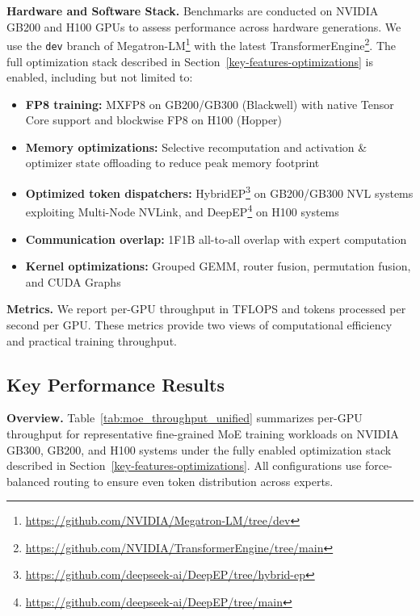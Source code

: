 \textbf{Hardware and Software Stack.}
Benchmarks are conducted on NVIDIA GB200 and H100 GPUs to assess performance across hardware generations. We use the \texttt{dev} branch of Megatron-LM\footnote{\url{https://github.com/NVIDIA/Megatron-LM/tree/dev}} with the latest TransformerEngine\footnote{\url{https://github.com/NVIDIA/TransformerEngine/tree/main}}. The full optimization stack described in Section~\ref{key-features-optimizations} is enabled, including but not limited to:
\begin{itemize}[noitemsep,topsep=0pt]
    \item \textbf{FP8 training:} MXFP8 on GB200/GB300 (Blackwell) with native Tensor Core support and blockwise FP8 on H100 (Hopper)
    \item \textbf{Memory optimizations:} Selective recomputation and activation \& optimizer state offloading to reduce peak memory footprint
    \item \textbf{Optimized token dispatchers:} HybridEP\footnote{\url{https://github.com/deepseek-ai/DeepEP/tree/hybrid-ep}} on GB200/GB300 NVL systems exploiting Multi-Node NVLink, and DeepEP\footnote{\url{https://github.com/deepseek-ai/DeepEP/tree/main}} on H100 systems
    \item \textbf{Communication overlap:} 1F1B all-to-all overlap with expert computation
    \item \textbf{Kernel optimizations:} Grouped GEMM, router fusion, permutation fusion, and CUDA Graphs
\end{itemize}

\textbf{Metrics.}
We report per-GPU throughput in TFLOPS and tokens processed per second per GPU. These metrics provide two views of computational efficiency and practical training throughput.

\subsection{Key Performance Results}


\textbf{Overview.}
Table~\ref{tab:moe_throughput_unified} summarizes per-GPU throughput for representative fine-grained MoE training workloads on NVIDIA GB300, GB200, and H100 systems under the fully enabled optimization stack described in Section~\ref{key-features-optimizations}. All configurations use force-balanced routing to ensure even token distribution across experts.


